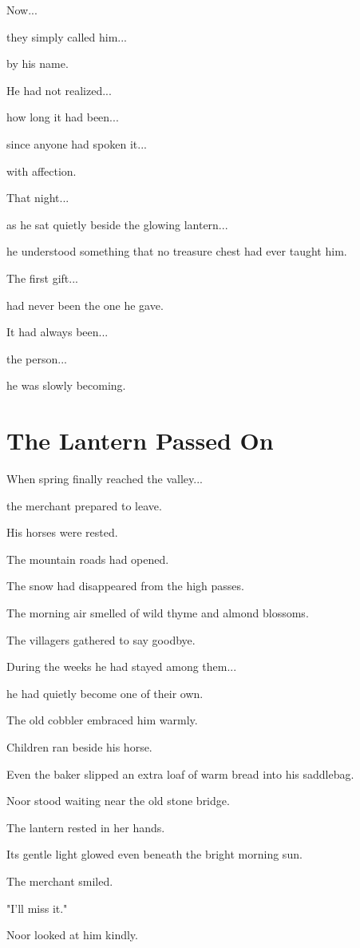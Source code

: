 \documentclass[12pt,openany]{book}
\begin{document}
Now...

they simply called him...

by his name.

He had not realized...

how long it had been...

since anyone had spoken it...

with affection.

That night...

as he sat quietly beside the glowing lantern...

he understood something that no treasure chest had ever taught him.

The first gift...

had never been the one he gave.

It had always been...

the person...

he was slowly becoming.
\section*{The Lantern Passed On}

When spring finally reached the valley...

the merchant prepared to leave.

His horses were rested.

The mountain roads had opened.

The snow had disappeared from the high passes.

The morning air smelled of wild thyme and almond blossoms.

The villagers gathered to say goodbye.

During the weeks he had stayed among them...

he had quietly become one of their own.

The old cobbler embraced him warmly.

Children ran beside his horse.

Even the baker slipped an extra loaf of warm bread into his saddlebag.

Noor stood waiting near the old stone bridge.

The lantern rested in her hands.

Its gentle light glowed even beneath the bright morning sun.

The merchant smiled.

"I'll miss it."

Noor looked at him kindly.
\end{document}
